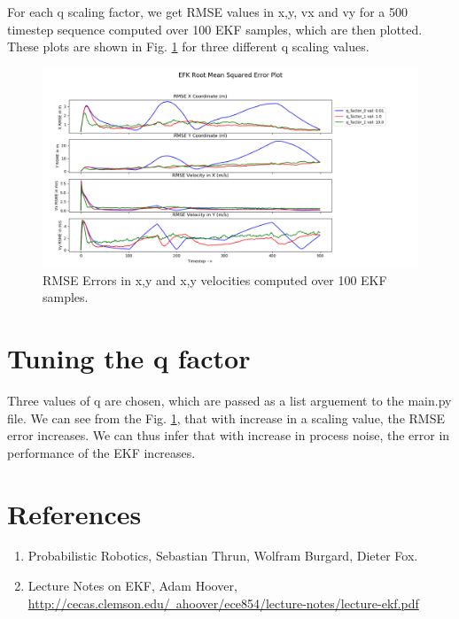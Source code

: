\documentclass[12pt]{article}
\begin{document}
For each q scaling factor, we get RMSE values in x,y, vx and vy  for a 500 timestep sequence computed over 100 EKF samples, which are  then plotted. These plots are shown in  Fig. \ref{fig:EKF_results} for three different q scaling values. 

\begin{figure}[!th]
\centering
\includegraphics[width=\textwidth]{../results/EKF_results_main.png}
\caption{RMSE Errors in x,y and x,y velocities computed over 100 EKF samples.}
\label{fig:EKF_results}
\end{figure}



\section{Tuning the q factor}
Three values of q are chosen, which are passed as a list arguement to the main.py file. We can see from the Fig. \ref{fig:EKF_results}, that with increase in a scaling value, the RMSE error increases. We can thus infer that with increase in process noise, the error in performance of the EKF increases.


\section{References}
\begin{enumerate}
  \item Probabilistic Robotics, Sebastian Thrun, Wolfram Burgard, Dieter Fox.
  \item Lecture Notes on EKF, Adam Hoover,
\href{http://cecas.clemson.edu/~ahoover/ece854/lecture-notes/lecture-ekf.pdf}{\color{blue}http://cecas.clemson.edu/~ahoover/ece854/lecture-notes/lecture-ekf.pdf}  
\end{enumerate}
\end{document}
